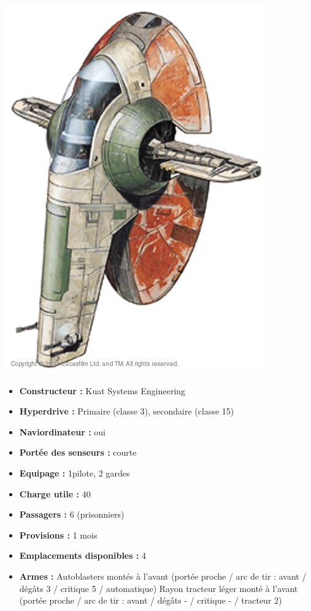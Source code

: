 \documentclass[twoside]{article}
\begin{document}
\noindent\begin{minipage}{0.3\textwidth}
	\includegraphics[width=1\linewidth]{../_img/species/firespray}
\end{minipage}%
\hfill%
\begin{minipage}{0.7\textwidth}\raggedleft
	\begin{itemize}
		\item \textbf{Constructeur :} Kuat Systems Engineering
		\item \textbf{Hyperdrive :} Primaire (classe 3), secondaire (classe 15)
		\item \textbf{Naviordinateur :} oui
		\item \textbf{Portée des senseurs :} courte
		\item \textbf{Equipage :} 1pilote, 2 gardes
		\item \textbf{Charge utile :} 40
		\item \textbf{Passagers :} 6 (prisonniers)
		\item \textbf{Provisions :} 1 mois 
		\item \textbf{Emplacements disponibles :} 4
		\item \textbf{Armes :} Autoblasters montés à l'avant (portée proche / arc de tir : avant / dégâts 3 / critique 5 / automatique) Rayon tracteur léger monté à l'avant (portée proche / arc de tir : avant / dégâts - / critique - / tracteur 2)
	\end{itemize}
\end{minipage}
\end{document}
